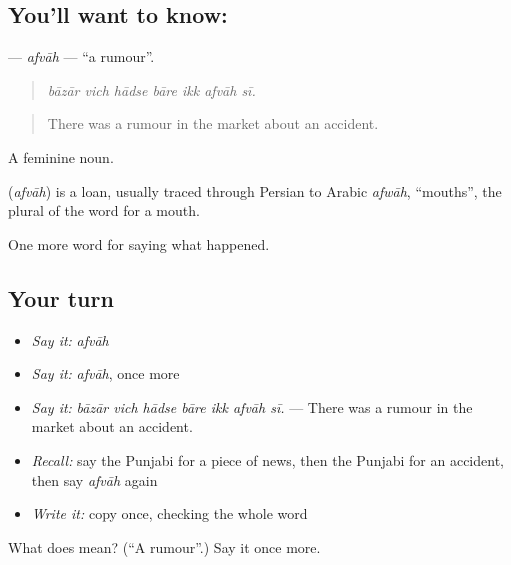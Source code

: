 \subsection*{You'll want to know: }
\textbf{} — \emph{afvāh} — \textquotedblleft{}a rumour\textquotedblright{}.

\begin{quote}
      
\end{quote}

\begin{quote}
\emph{bāzār vich hādse bāre ikk afvāh sī.}
\end{quote}

\begin{quote}
There was a rumour in the market about an accident.
\end{quote}

A feminine noun.

\begin{cousinweb}
\textbf{} (\emph{afvāh}) is a loan, usually traced through Persian to Arabic \emph{afwāh}, \textquotedblleft{}mouths\textquotedblright{}, the plural of the word for a mouth.
\end{cousinweb}

\begin{grammarlens}[title={What you've built}]
One more word for saying what happened.
\end{grammarlens}

\subsection*{Your turn}
\begin{itemize}
\raggedright
  \item \emph{Say it:} \emph{afvāh}
  \item \emph{Say it:} \emph{afvāh}, once more
  \item \emph{Say it:} \emph{bāzār vich hādse bāre ikk afvāh sī.} — There was a rumour in the market about an accident.
  \item \emph{Recall:} say the Punjabi for a piece of news, then the Punjabi for an accident, then say \emph{afvāh} again
  \item \emph{Write it:} copy \textbf{} once, checking the whole word
\end{itemize}

\begin{tcolorbox}[breakable,colback=teal!4,colframe=teal!35!black,title={Before you move on}]
What does  mean? (\textquotedblleft{}A rumour\textquotedblright{}.) Say it once more.
\end{tcolorbox}
